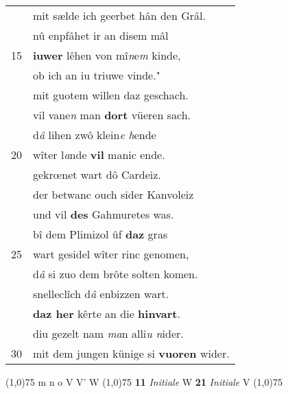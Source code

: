 \documentclass[8pt,a4paper,notitlepage]{article}
\begin{document}
\begin{table}[ht]
\begin{minipage}[t]{0.5\linewidth}
\begin{tabular}{rl}
 & mit sælde ich geerbet hân den Grâl.\\ 
 & nû enpfâhet ir an disem mâl\\ 
15 & \textbf{iuwer} lêhen von mî\textit{n}e\textit{m} kinde,\\ 
 & ob ich an iu triuwe vinde."\\ 
 & mit guotem willen daz geschach.\\ 
 & vil vane\textit{n} man \textbf{dort} vüeren sach.\\ 
 & d\textit{â} lihen zwô klein\textit{e h}ende\\ 
20 & wîter l\textit{a}nde \textbf{vil} manic ende.\\ 
 & gekrœnet wart dô Cardeiz.\\ 
 & der betwanc ouch sider Kanvoleiz\\ 
 & und vil \textbf{des} Gahmuretes was.\\ 
 & bî dem Plimizol ûf \textbf{daz} gras\\ 
25 & wart gesidel wîter rinc genomen,\\ 
 & d\textit{â} si zuo dem brôte solten komen.\\ 
 & snelleclîch d\textit{â} enbizzen wart.\\ 
 & \textbf{daz her} kêrte an die \textbf{hinvart}.\\ 
 & diu gezelt nam \textit{ma}n alli\textit{u n}ider.\\ 
30 & mit dem jungen künige si \textbf{vuoren} wider.\\ 
\end{tabular}
\scriptsize
\line(1,0){75} \newline
m n o V V' W \newline
\line(1,0){75} \newline
\textbf{11} \textit{Initiale} W  \textbf{21} \textit{Initiale} V  \newline
\line(1,0){75} \newline

\end{minipage}
\end{table}
\end{document}
